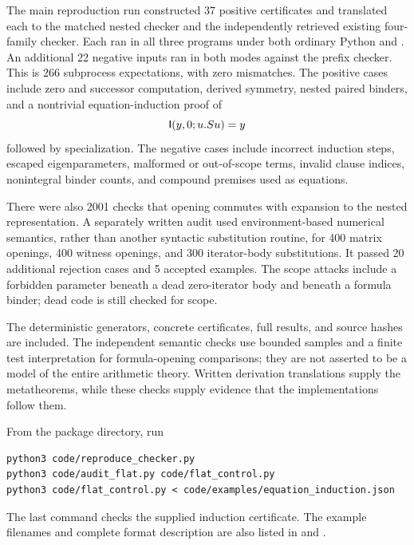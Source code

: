 The main reproduction run constructed 37 positive certificates and
translated each to the matched nested checker and the independently
retrieved existing four-family checker. Each ran in all three programs
under both ordinary Python and . An additional 22 negative
inputs ran in both modes against the prefix checker. This is 266 subprocess
expectations, with zero mismatches. The positive cases include zero and
successor computation, derived symmetry, nested paired binders, and a
nontrivial equation-induction proof of
\[
 \mathsf I(y,0;u.Su)=y
\]
followed by specialization. The negative cases include incorrect induction
steps, escaped eigenparameters, malformed or out-of-scope terms, invalid
clause indices, nonintegral binder counts, and compound premises used as
equations.

There were also 2001 checks that opening commutes with expansion to the
nested representation. A separately written audit used environment-based
numerical semantics, rather than another syntactic substitution routine,
for 400 matrix openings, 400 witness openings, and 300 iterator-body
substitutions. It passed 20 additional rejection cases and 5 accepted
examples. The scope attacks include a forbidden parameter beneath a dead
zero-iterator body and beneath a formula binder; dead code is still
checked for scope.

The deterministic generators, concrete certificates, full results, and
source hashes are included. The independent semantic checks use bounded
samples and a finite test interpretation for formula-opening comparisons;
they are not asserted to be a model of the entire arithmetic theory.
Written derivation translations supply the metatheorems, while these
checks supply evidence that the implementations follow them.

From the package directory, run
\begin{lstlisting}
python3 code/reproduce_checker.py
python3 code/audit_flat.py code/flat_control.py
python3 code/flat_control.py < code/examples/equation_induction.json
\end{lstlisting}
The last command checks the supplied induction certificate. The example
filenames and complete format description are also listed in
 and .
